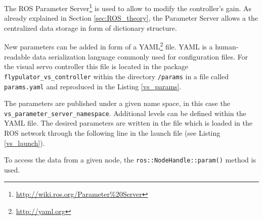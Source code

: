 The ROS Parameter Server\footnote{\url{http://wiki.ros.org/Parameter\%20Server}}  is used to allow to modify the controller's gain. As already explained in Section \ref{sec:ROS_theory}, the Parameter Server allows a the centralized data storage in form of dictionary structure. 

New parameters can be added in form of a YAML\footnote{\url{http://yaml.org}} file. YAML is a human-readable data serialization language commonly used for configuration files. For the visual servo controller this file is located in the package \texttt{flypulator\_vs\_controller} within the directory \texttt{/params} in a file called \texttt{params.yaml} and reproduced in the Listing \ref{vs_params}.


The parameters are published under a given name space, in this case the \texttt{vs\_parameter\_server\_namespace}. Additional levels can be defined within the YAML file. The desired parameters are written in the file which is loaded in the ROS network through the following line in the launch file (see Listing \ref{vs_launch}).

 To access the data from a given node, the \texttt{ros::NodeHandle::param()} method is used. 


